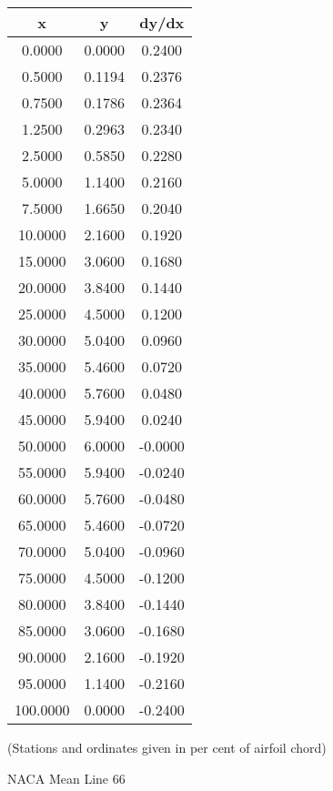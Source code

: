 \documentclass[11pt]{book}
\begin{document}
 \vspace{8mm}
 \begin{tabular}{|c|c|c|}  \hline
 x & y & dy/dx \\
 \hline
0.0000 & 0.0000 & 0.2400 \\
0.5000 & 0.1194 & 0.2376 \\
0.7500 & 0.1786 & 0.2364 \\
1.2500 & 0.2963 & 0.2340 \\
2.5000 & 0.5850 & 0.2280 \\
5.0000 & 1.1400 & 0.2160 \\
7.5000 & 1.6650 & 0.2040 \\
10.0000 & 2.1600 & 0.1920 \\
15.0000 & 3.0600 & 0.1680 \\
20.0000 & 3.8400 & 0.1440 \\
25.0000 & 4.5000 & 0.1200 \\
30.0000 & 5.0400 & 0.0960 \\
35.0000 & 5.4600 & 0.0720 \\
40.0000 & 5.7600 & 0.0480 \\
45.0000 & 5.9400 & 0.0240 \\
50.0000 & 6.0000 & -0.0000 \\
55.0000 & 5.9400 & -0.0240 \\
60.0000 & 5.7600 & -0.0480 \\
65.0000 & 5.4600 & -0.0720 \\
70.0000 & 5.0400 & -0.0960 \\
75.0000 & 4.5000 & -0.1200 \\
80.0000 & 3.8400 & -0.1440 \\
85.0000 & 3.0600 & -0.1680 \\
90.0000 & 2.1600 & -0.1920 \\
95.0000 & 1.1400 & -0.2160 \\
100.0000 & 0.0000 & -0.2400 \\
 \hline
 \end{tabular}
 \vspace{8mm}

(Stations and ordinates given in per cent of airfoil chord)

 \newpage
 \label{ml66}
 \begin{Large}
 NACA Mean Line 66
 \end{Large}
  
\end{document}
